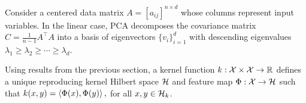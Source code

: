 Consider a centered data matrix \(A = [a_{ij}]^{n \times d}\) whose columns represent input variables.
In the linear case, PCA decomposes the covariance matrix \(C = \frac{1}{n-1}A^\top A\) into a basis of eigenvectors \(\{v_i\}_{i=1}^d\) with descending eigenvalues \(\lambda_1 \geq \lambda_2 \geq \cdots \geq \lambda_d\).

Using results from the previous section, a kernel function \(k : \mathcal{X} \times \mathcal{X} \to \mathbb{R}\) defines a unique reproducing kernel Hilbert space \(\mathcal{H}\) and feature map \(\Phi : \mathcal{X} \to \mathcal{H}\) such that
    \(k(x,y) = \left\langle \Phi(x), \Phi(y) \right\rangle,\)
for all \(x, y \in \mathcal{H}_k\).